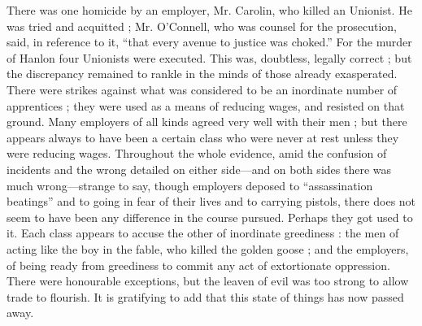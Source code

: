 There was one homicide by an employer, Mr. Carolin, who killed an
Unionist. He was tried and acquitted ; Mr. O'Connell, who was counsel
for the prosecution, said, in reference to it, ``that every avenue to
justice was choked.'' For the murder of Hanlon four Unionists were
executed. This was, doubtless, legally correct ; but the discrepancy
remained to rankle in the minds of those already exasperated. There were
strikes against what was considered to be an inordinate number of
apprentices ; they were used as a means of reducing wages, and resisted
on that ground. Many employers of all kinds agreed very well with their
men ; but there appears always to have been a certain class who were
never at rest unless they were reducing wages. Throughout the whole
evidence, amid the confusion of incidents and the wrong detailed on
either side---and on both sides there was much wrong---strange to say,
though employers deposed to ``assassination beatings'' and to going in
fear of their lives and to carrying pistols, there does not seem to have
been any difference in the course pursued. Perhaps they got used to it.
Each class appears to accuse the other of inordinate greediness : the
men of acting like the boy in the fable, who killed the golden goose ;
and the employers, of being ready from greediness to commit any act of
extortionate oppression. There were honourable exceptions, but the
leaven of evil was too strong to allow trade to flourish. It is
gratifying to add that this state of things has now passed away.

